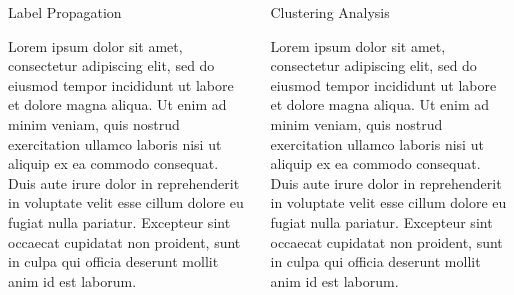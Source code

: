 \documentclass[final]{beamer}
\newlength{\onecolwid}
\newlength{\twocolwid}
\begin{document}
\begin{frame}[t]
\begin{columns}[t]
\begin{column}{\twocolwid}
\begin{columns}[t,totalwidth=\twocolwid]
\begin{column}{\onecolwid}\vspace{-.6in} %


\begin{block}{Label Propagation}

Lorem ipsum dolor sit amet, consectetur adipiscing elit, sed do eiusmod tempor incididunt ut labore et dolore magna aliqua. Ut enim ad minim veniam, quis nostrud exercitation ullamco laboris nisi ut aliquip ex ea commodo consequat. Duis aute irure dolor in reprehenderit in voluptate velit esse cillum dolore eu fugiat nulla pariatur. Excepteur sint occaecat cupidatat non proident, sunt in culpa qui officia deserunt mollit anim id est laborum.

\end{block}



\end{column} %

\begin{column}{\onecolwid}\vspace{-.6in} %


\begin{block}{Clustering Analysis}

Lorem ipsum dolor sit amet, consectetur adipiscing elit, sed do eiusmod tempor incididunt ut labore et dolore magna aliqua. Ut enim ad minim veniam, quis nostrud exercitation ullamco laboris nisi ut aliquip ex ea commodo consequat. Duis aute irure dolor in reprehenderit in voluptate velit esse cillum dolore eu fugiat nulla pariatur. Excepteur sint occaecat cupidatat non proident, sunt in culpa qui officia deserunt mollit anim id est laborum.


\end{block}
\end{column}
\end{columns}
\end{column}
\end{columns}
\end{frame}
\end{document}
